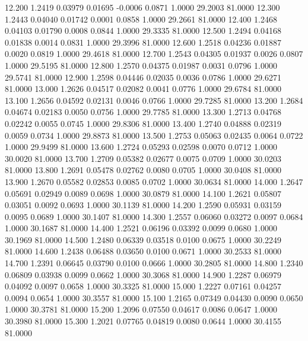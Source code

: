   12.200   1.2419   0.03979   0.01695  -0.0006   0.0871   1.0000  29.2003  81.0000
  12.300   1.2443   0.04040   0.01742   0.0001   0.0858   1.0000  29.2661  81.0000
  12.400   1.2468   0.04103   0.01790   0.0008   0.0844   1.0000  29.3335  81.0000
  12.500   1.2494   0.04168   0.01838   0.0014   0.0831   1.0000  29.3996  81.0000
  12.600   1.2518   0.04236   0.01887   0.0020   0.0819   1.0000  29.4618  81.0000
  12.700   1.2543   0.04305   0.01937   0.0026   0.0807   1.0000  29.5195  81.0000
  12.800   1.2570   0.04375   0.01987   0.0031   0.0796   1.0000  29.5741  81.0000
  12.900   1.2598   0.04446   0.02035   0.0036   0.0786   1.0000  29.6271  81.0000
  13.000   1.2626   0.04517   0.02082   0.0041   0.0776   1.0000  29.6784  81.0000
  13.100   1.2656   0.04592   0.02131   0.0046   0.0766   1.0000  29.7285  81.0000
  13.200   1.2684   0.04674   0.02183   0.0050   0.0756   1.0000  29.7785  81.0000
  13.300   1.2713   0.04768   0.02242   0.0055   0.0745   1.0000  29.8306  81.0000
  13.400   1.2740   0.04888   0.02319   0.0059   0.0734   1.0000  29.8873  81.0000
  13.500   1.2753   0.05063   0.02435   0.0064   0.0722   1.0000  29.9499  81.0000
  13.600   1.2724   0.05293   0.02598   0.0070   0.0712   1.0000  30.0020  81.0000
  13.700   1.2709   0.05382   0.02677   0.0075   0.0709   1.0000  30.0203  81.0000
  13.800   1.2691   0.05478   0.02762   0.0080   0.0705   1.0000  30.0408  81.0000
  13.900   1.2670   0.05582   0.02853   0.0085   0.0702   1.0000  30.0634  81.0000
  14.000   1.2647   0.05691   0.02949   0.0089   0.0698   1.0000  30.0879  81.0000
  14.100   1.2621   0.05807   0.03051   0.0092   0.0693   1.0000  30.1139  81.0000
  14.200   1.2590   0.05931   0.03159   0.0095   0.0689   1.0000  30.1407  81.0000
  14.300   1.2557   0.06060   0.03272   0.0097   0.0684   1.0000  30.1687  81.0000
  14.400   1.2521   0.06196   0.03392   0.0099   0.0680   1.0000  30.1969  81.0000
  14.500   1.2480   0.06339   0.03518   0.0100   0.0675   1.0000  30.2249  81.0000
  14.600   1.2438   0.06488   0.03650   0.0100   0.0671   1.0000  30.2533  81.0000
  14.700   1.2391   0.06645   0.03790   0.0100   0.0666   1.0000  30.2805  81.0000
  14.800   1.2340   0.06809   0.03938   0.0099   0.0662   1.0000  30.3068  81.0000
  14.900   1.2287   0.06979   0.04092   0.0097   0.0658   1.0000  30.3325  81.0000
  15.000   1.2227   0.07161   0.04257   0.0094   0.0654   1.0000  30.3557  81.0000
  15.100   1.2165   0.07349   0.04430   0.0090   0.0650   1.0000  30.3781  81.0000
  15.200   1.2096   0.07550   0.04617   0.0086   0.0647   1.0000  30.3980  81.0000
  15.300   1.2021   0.07765   0.04819   0.0080   0.0644   1.0000  30.4155  81.0000
